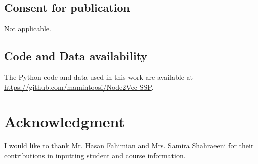 \documentclass[pdflatex,sn-mathphys-num,iicol]{sn-jnl}%
\theoremstyle{thmstyleone}%
\theoremstyle{thmstyletwo}%
\theoremstyle{thmstylethree}%
\begin{document}
\subsection*{Consent for publication}
Not applicable.

\subsection*{Code and Data availability}
The Python code and data used in this work are available at \url{https://github.com/mamintoosi/Node2Vec-SSP}.

\section*{Acknowledgment}
I would like to thank Mr. Hasan Fahimian and Mrs. Samira Shahraeeni for their contributions in inputting student and course information.
\end{document}
